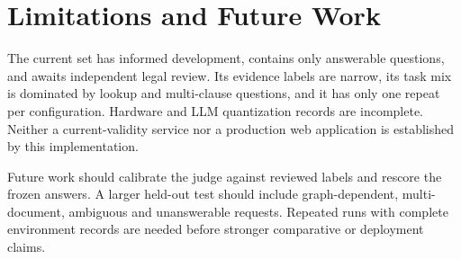 \section{Limitations and Future Work}
The current set has informed development, contains only answerable questions, and awaits independent legal review. Its evidence labels are narrow, its task mix is dominated by lookup and multi-clause questions, and it has only one repeat per configuration. Hardware and LLM quantization records are incomplete. Neither a current-validity service nor a production web application is established by this implementation.

Future work should calibrate the judge against reviewed labels and rescore the frozen answers. A larger held-out test should include graph-dependent, multi-document, ambiguous and unanswerable requests. Repeated runs with complete environment records are needed before stronger comparative or deployment claims.
